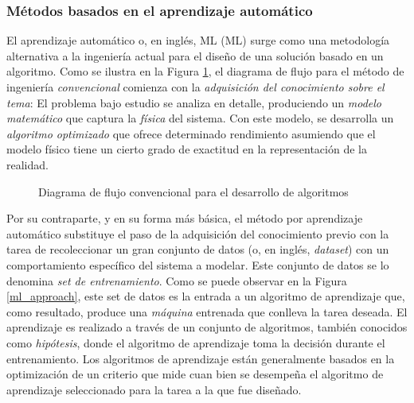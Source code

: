 \documentclass[10pt,a4paper]{article}
\begin{document}
\subsubsection{M\'etodos basados en el aprendizaje autom\'atico}

\noindent El aprendizaje autom\'atico o, en ingl\'es, \acrlong{ML} 
(\acrshort{ML}) surge como una metodolog\'ia alternativa a la ingenier\'ia 
actual para el diseño de una soluci\'on basado en un algoritmo. Como se ilustra 
en la Figura \ref{curr_eng_approach}, el diagrama de flujo para el m\'etodo
de ingenier\'ia \emph{convencional} comienza con la 
\emph{adquisici\'on del conocimiento sobre el tema}: El problema bajo estudio se
analiza en detalle, produciendo un \emph{modelo matem\'atico} que captura la
\emph{f\'isica} del sistema. Con este modelo, se desarrolla un \emph{algoritmo
optimizado} que ofrece determinado rendimiento asumiendo que el modelo f\'isico
tiene un cierto grado de exactitud en la representaci\'on de la realidad.

\begin{figure}[h!]
    \begin{center}
    \end{center}
    \caption{Diagrama de flujo convencional para el desarrollo de algoritmos}
    \label{curr_eng_approach}
\end{figure}

\noindent Por su contraparte, y en su forma m\'as b\'asica, el m\'etodo por
aprendizaje autom\'atico substituye el paso de la adquisici\'on del conocimiento
previo con la tarea de recoleccionar un gran conjunto de datos (o, en ingl\'es,
\emph{dataset}) con un comportamiento espec\'ifico del sistema a modelar. Este
conjunto de datos se lo denomina \emph{set de entrenamiento}. Como se puede 
observar en la Figura \ref{ml_approach}, este set de datos es la entrada a
un algoritmo de aprendizaje que, como resultado, produce una \emph{m\'aquina}
entrenada que conlleva la tarea deseada. El aprendizaje es realizado a trav\'es
de un conjunto de algoritmos, tambi\'en conocidos como \emph{hip\'otesis}, donde
el algoritmo de aprendizaje toma la decisi\'on durante el entrenamiento. Los
algoritmos de aprendizaje est\'an generalmente basados en la optimizaci\'on de
un criterio que mide cuan bien se desempeña el algoritmo de aprendizaje 
seleccionado para la tarea a la que fue diseñado.
\end{document}
